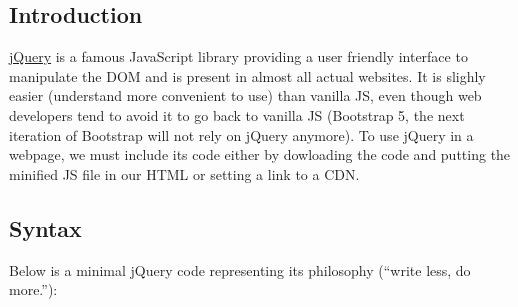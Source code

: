 \documentclass[]{book}
\newenvironment{Shaded}{\begin{snugshade}}{\end{snugshade}}
\newcommand{\AttributeTok}[1]{\textcolor[rgb]{0.77,0.63,0.00}{#1}}
\newcommand{\CommentTok}[1]{\textcolor[rgb]{0.56,0.35,0.01}{\textit{#1}}}
\newcommand{\DataTypeTok}[1]{\textcolor[rgb]{0.13,0.29,0.53}{#1}}
\newcommand{\KeywordTok}[1]{\textcolor[rgb]{0.13,0.29,0.53}{\textbf{#1}}}
\newcommand{\NormalTok}[1]{#1}
\newcommand{\OperatorTok}[1]{\textcolor[rgb]{0.81,0.36,0.00}{\textbf{#1}}}
\newcommand{\OtherTok}[1]{\textcolor[rgb]{0.56,0.35,0.01}{#1}}
\newcommand{\StringTok}[1]{\textcolor[rgb]{0.31,0.60,0.02}{#1}}
\begin{document}
\hypertarget{introduction-1}{%
\subsection{Introduction}\label{introduction-1}}

\href{https://jquery.com}{jQuery} is a famous JavaScript library providing a user friendly interface to manipulate the DOM and is present in almost all actual websites. It is slighly easier (understand more convenient to use) than vanilla JS, even though web developers tend to avoid it to go back to vanilla JS (Bootstrap 5, the next iteration of Bootstrap will not rely on jQuery anymore). To use jQuery in a webpage, we must include its code either by dowloading the code and putting the minified JS file in our HTML or setting a link to a CDN.

\begin{Shaded}
\end{Shaded}

\hypertarget{syntax}{%
\subsection{Syntax}\label{syntax}}

Below is a minimal jQuery code representing its philosophy (``write less, do more.''):

\begin{Shaded}
\end{Shaded}
\end{document}
